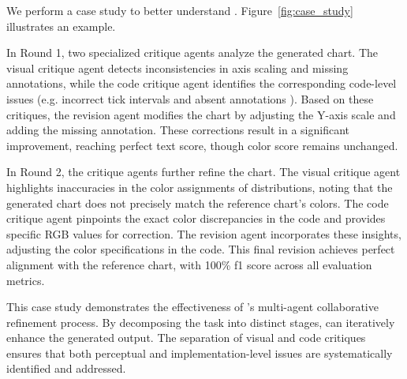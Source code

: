 We perform a case study to better understand \model{}. Figure~\ref{fig:case_study} illustrates an example.  

In Round 1, two specialized critique agents analyze the generated chart. The visual critique agent detects inconsistencies in axis scaling and missing annotations, while the code critique agent identifies the corresponding code-level issues (e.g. incorrect tick intervals and absent annotations ). Based on these critiques, the revision agent modifies the chart by adjusting the Y-axis scale and adding the missing annotation. These corrections result in a significant improvement, reaching perfect text score, though color score remains unchanged.

In Round 2, the critique agents further refine the chart. The visual critique agent highlights inaccuracies in the color assignments of distributions, noting that the generated chart does not precisely match the reference chart’s colors. The code critique agent pinpoints the exact color discrepancies in the code and provides specific RGB values for correction. The revision agent incorporates these insights, adjusting the color specifications in the code. This final revision achieves perfect alignment with the reference chart, with 100\% f1 score across all evaluation metrics.

This case study demonstrates the effectiveness of \model’s multi-agent collaborative refinement process. By decomposing the task into distinct stages, \model{} can iteratively enhance the generated output. The separation of visual and code critiques ensures that both perceptual and implementation-level issues are systematically identified and addressed. 


